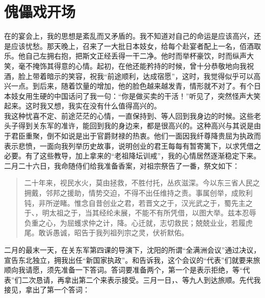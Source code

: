 \fancyhead[RO]{} %
\fancyhead[LE]{} %
\chapter*{傀儡戏开场}
\thispagestyle{empty}
  在的宴会上，我的思想是紊乱而又矛盾的。我不知道对自己的命运是应该高兴，还是应该忧愁。那天晚上，召来了一大批日本妓女，给每个赴宴者配上一名，佰酒取乐。他自己左拥右抱，把斯文正经丢得一干二净。他时而举杯豪饮，时而纵声大笑，毫不掩饰其得意的心情。起初，在他还能矜持的时候，曾十分恭敬地向我祝酒，脸上带着暗示的笑容，祝我“前途顺利，达成宿愿”，这时，我觉得似乎可以高兴一点。到后来，随着饮量的增加，他的脸色越来越发青，情形就不对了。有个日本妓女用生硬的中国话问了我一句：“你是做买卖的干活！”听见了，突然怪声大笑起来。这时我又想，我实在没有什么值得高兴的。\\

我这种忧喜不定、前途茫茫的心情，一直保持到、等人回到我身边的时候。这些老头子得到关东军的准许，能回到我的身边来，都是很高兴的。这种高兴与其说是由于君臣重聚，倒不如说是出于官爵财禄的热衷。他们一面因我纤尊降贵屈为执政而表示悲愤，一面向我列举历史故事，说明创业的君王每每有暂寄篱下，以求凭借之必要。有了这些教导，加上拿来的“老祖降坛训戒”，我的心情居然逐渐稳定下来。二月二十六日，我命随侍们给我准备香案，对祖宗祭告了一番，祭文如下：\\

\begin{quote}
	二十年来，视民水火，莫由拯救，不胜付托，丛疚滋深。今以东三省人民之拥戴，邻邦之援助，情势交迫，不得不出任维持之责。事属创举，成败利钝，非所逆睹。惟念自昔创业之君，若晋文之于，汉光武之于，蜀先主之于、，明太祖之于，当其经纶未展，不能不有所凭借，以图大举。兹本忍辱负重之心，为屈蠖求仲之计，降。心迁就，志切救民；兢兢业业，若履虎尾。敢诉愚诚，昭告于我列祖列宗之灵，伏祈默佑。\\
\end{quote}

二月的最末一天，在关东军第四课的导演下，沈阳的所谓“全满洲会议”通过决议，宣告东北独立，拥我出任“新国家执政”。和告诉我，这个会议的“代表”们就要来旅顺向我请愿，须先准备一下答词。答词要准备两个，第一个是表示拒绝，等“代表”们二次恳请，再拿出第二个来表示接受。三月一日，、等九人到达旅顺。先代我接见，拿出了第一个答词：\\

